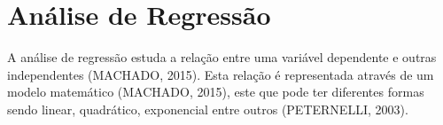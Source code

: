 


\section{Análise de Regressão} %

A análise de regressão estuda a relação entre uma variável dependente e outras independentes (MACHADO, 2015). Esta relação é representada através de um modelo matemático (MACHADO, 2015), este que pode ter diferentes formas sendo linear, quadrático, exponencial entre outros (PETERNELLI, 2003). 



